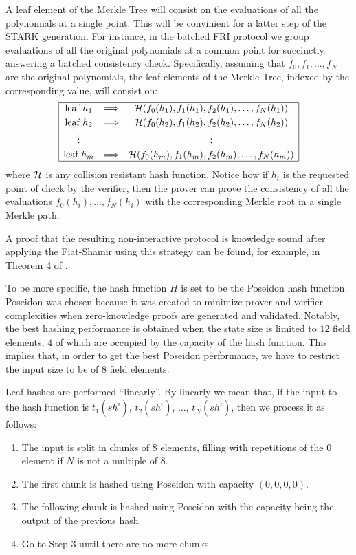 A leaf element of the Merkle Tree will consist on the evaluations of all the polynomials at a single point. This will be convinient for a latter step of the STARK generation. For instance, in the batched FRI protocol we group evaluations of all the original polynomials at a common point for succinctly answering a batched consistency check. Specifically, assuming that $f_0,f_1,\dots,f_N$ are the original polynomials,  the leaf elements of the Merkle Tree, indexed by the corresponding value, will consist on:
\[
\begin{array}{|ccc|}
\hline
\text{leaf } h_1 & \Longrightarrow & \mathcal{H}(f_0(h_1), f_1(h_1), f_2(h_1), \dots, f_N(h_1)) \\[0.1cm]
\text{leaf } h_2 & \Longrightarrow & \mathcal{H}(f_0(h_2), f_1(h_2), f_2(h_2), \dots, f_N(h_2)) \\
\vdots &  & \vdots \\[0.1cm]
\text{leaf } h_m & \Longrightarrow & \mathcal{H}(f_0(h_m), f_1(h_m), f_2(h_m), \dots, f_N(h_m)) \\
\hline
\end{array}
\]
where $\mathcal{H}$ is any collision resistant hash function. Notice how if $h_i$ is the requested point of check by the verifier, then the prover can prove the consistency of all the evaluations $f_0(h_i),\dots,f_N(h_i)$ with the corresponding Merkle root in a single Merkle path.

A proof that the resulting non-interactive protocol is knowledge sound after applying the Fiat-Shamir using this strategy can be found, for example, in Theorem 4 of \cite{EPRINT:AttFehKlo21}.


\ifPOLYGON
To be more specific, the hash function $H$ is set to be the Poseidon \cite{USENIX:GKRRS21} hash function. Poseidon was chosen because it was created to minimize prover and verifier complexities when zero-knowledge proofs are generated and validated. Notably, the best hashing performance is obtained when the state size is limited to $12$ field elements, $4$ of which are occupied by the capacity of the hash function. This implies that, in order to get the best Poseidon performance, we have to restrict the input size to be of $8$ field elements.

Leaf hashes are performed ``linearly''. By linearly we mean that, if the input to the hash function is $t_1(sh^i)$, $t_2(sh^i)$, $\dots$, $t_N(sh^i)$, then we process it as follows:
\begin{enumerate}
	\item The input is split in chunks of $8$ elements, filling with repetitions of the $0$ element if $N$ is not a multiple of $8$.
	\item The first chunk is hashed using Poseidon with capacity $(0, 0, 0, 0)$.
	\item The following chunk is hashed using Poseidon with the capacity being the output of the previous hash.
	\item Go to Step 3 until there are no more chunks.
\end{enumerate}

